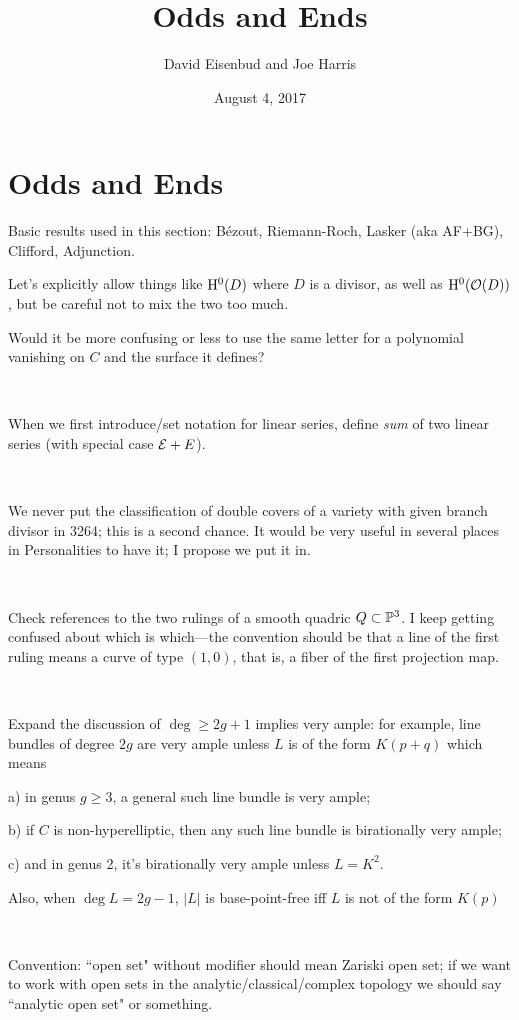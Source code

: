 \documentclass[12pt, leqno]{article}
\date{August 4, 2017}
\title{Odds and Ends}
\author{David Eisenbud and Joe Harris }
\def\cE{{\cal E}}
\begin{document}
\maketitle

\setlength{\parskip}{5pt}

\section{Odds and Ends}

Basic results used in this section: B\'ezout, Riemann-Roch, Lasker (aka AF+BG), Clifford, Adjunction.

Let's explicitly allow things like $\HH^0(D)$ where $D$ is a divisor, as well as $\HH^0(\cO(D))$, but be careful not to mix the two too much.

Would it be more confusing or less to use the same letter for a polynomial vanishing on $C$ and the surface it defines?

\

When we first introduce/set notation for linear series, define \emph{sum} of two linear series 
(with special case $\cE + E$).

\

We never put the classification of double covers of a variety with given branch divisor in 3264; this is a second chance. It would be very useful in several places in Personalities to have it; I propose we put it in.

\

Check references to the two rulings of a smooth quadric $Q \subset \PP^3$. I keep getting confused about which is which---the convention should be that a line of the first ruling means a curve of type $(1,0)$, that is, a fiber of the first projection map.

\

Expand the discussion of $\deg \geq 2g+1$ implies very ample: for example, line bundles of degree $2g$ are very ample unless $L$ is of the form $K(p+q)$ which means 

a) in genus $g \geq 3$, a general such line bundle is very ample; 

b) if $C$ is non-hyperelliptic, then any such line bundle is birationally very ample;

c) and in genus 2, it's birationally very ample unless $L = K^2$.

Also, when $\deg L = 2g-1$, $|L|$ is base-point-free iff $L$ is not of the form $K(p)$

\

Convention: ``open set" without modifier should mean Zariski open set; if we want to work with open sets in the analytic/classical/complex topology we should say ``analytic open set" or something.
\end{document}
